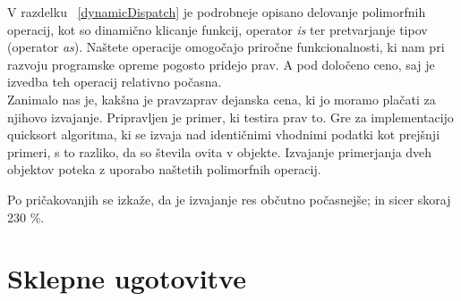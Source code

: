 \documentclass[a4paper, 12p]{book}
\begin{document}
V razdelku ~\ref{dynamicDispatch} je podrobneje opisano delovanje polimorfnih operacij, kot so dinamično klicanje funkcij, operator \textit{is} ter pretvarjanje tipov (operator \textit{as}). Naštete operacije omogočajo priročne funkcionalnosti, ki nam pri razvoju programske opreme pogosto pridejo prav. A pod določeno ceno, saj je izvedba teh operacij relativno počasna. \\
\indent Zanimalo nas je, kakšna je pravzaprav dejanska cena, ki jo moramo plačati za njihovo izvajanje. Pripravljen je primer, ki testira prav to.
Gre za implementacijo quicksort algoritma, ki se izvaja nad identičnimi vhodnimi podatki kot prejšnji primeri, s to razliko, da so števila ovita v objekte. Izvajanje primerjanja dveh objektov poteka z uporabo naštetih polimorfnih operacij. \\


Po pričakovanjih se izkaže, da je izvajanje res občutno počasnejše; in sicer skoraj 230 \%. 

\chapter{Sklepne ugotovitve}
\end{document}
